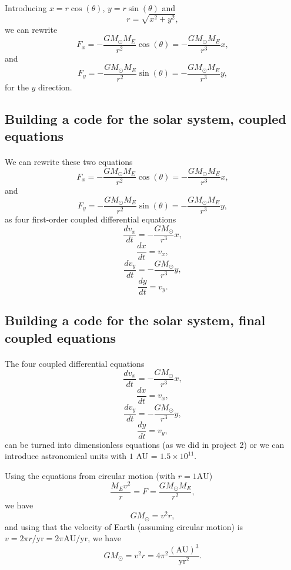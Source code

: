 \documentclass[%
oneside,                 %
final,                   %
10pt]{article}
\begin{document}
\paragraph{}
Introducing $x=r\cos{(\theta)}$, $y=r\sin{(\theta)}$ and
\[
r = \sqrt{x^2+y^2},
\]
we can rewrite 
  \[
   F_{x}=-\frac{GM_{\odot}M_E}{r^2}\cos{(\theta)}=-\frac{GM_{\odot}M_E}{r^3}x,
  \]
and
  \[
     F_{y}=-\frac{GM_{\odot}M_E}{r^2}\sin{(\theta)}=-\frac{GM_{\odot}M_E}{r^3}y,
  \]
for the $y$ direction.




\subsection{Building a code for the solar system, coupled equations}

\paragraph{}
We can rewrite these two equations
  \[
   F_{x}=-\frac{GM_{\odot}M_E}{r^2}\cos{(\theta)}=-\frac{GM_{\odot}M_E}{r^3}x,
  \]
and
  \[
     F_{y}=-\frac{GM_{\odot}M_E}{r^2}\sin{(\theta)}=-\frac{GM_{\odot}M_E}{r^3}y,
  \]
as four first-order coupled differential equations
\[
   \frac{dv_x}{dt}=-\frac{GM_{\odot}}{r^3}x,
\]
\[
   \frac{dx}{dt}=v_x,
\]
\[
   \frac{dv_y}{dt}=-\frac{GM_{\odot}}{r^3}y,
\]
\[
   \frac{dy}{dt}=v_y.
\]




\subsection{Building a code for the solar system, final coupled equations}

\paragraph{}
The four coupled differential equations
\[
   \frac{dv_x}{dt}=-\frac{GM_{\odot}}{r^3}x,
\]
\[
   \frac{dx}{dt}=v_x,
\]
\[
   \frac{dv_y}{dt}=-\frac{GM_{\odot}}{r^3}y,
\]
\[
   \frac{dy}{dt}=v_y,
\]
can be turned into dimensionless equations (as we did in project 2) or we can introduce astronomical units with $1$ AU = $1.5\times 10^{11}$. 

Using the equations from circular motion (with $r =1\mathrm{AU}$) 
\[
\frac{M_E v^2}{r} = F = \frac{GM_{\odot}M_E}{r^2},
\]
we have
\[
GM_{\odot}=v^2r,
\]
and using that the velocity of Earth (assuming circular motion) is
$v = 2\pi r/\mathrm{yr}=2\pi\mathrm{AU}/\mathrm{yr}$, we have
\[
GM_{\odot}= v^2r = 4\pi^2 \frac{(\mathrm{AU})^3}{\mathrm{yr}^2}.
\]
\end{document}
